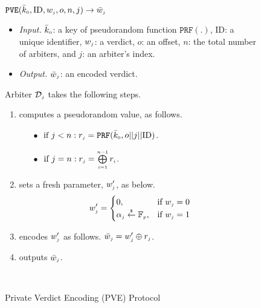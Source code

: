 \begin{figure}[!ht]
\setlength{\fboxsep}{0.7pt}
\begin{center}
\begin{boxedminipage}{12.3cm}
\small{
\underline{$\mathtt{PVE}(\bar{k}_{\scriptscriptstyle 0}, \text{ID},  w_{\scriptscriptstyle j}, o, n,  j)\rightarrow  \bar{  w}_{\scriptscriptstyle j}$}\\
%
\begin{itemize}
\item \noindent\textit{Input.} $\bar{k}_{\scriptscriptstyle 0}$: a key of  pseudorandom function $\mathtt{PRF}(.)$, $\text{ID}$: a unique identifier, $ w_{\scriptscriptstyle j}$: a  verdict, $o$: an offset, $n$: the total number of  arbiters,  and  $j$: an arbiter's index.
%
\item \noindent\textit{Output.} $\bar{  w}_{\scriptscriptstyle j}$:  an  encoded verdict.  
%
\end{itemize}
Arbiter $\mathcal{D}_{\scriptscriptstyle j}$ takes the following steps.
\begin{enumerate}
%
\item\label{ZSPA:val-gen} computes a  pseudorandom  value,  as follows. 
%
\begin{itemize}
%
\item[$\bullet$]$ \text{ if } j< n: r_{\scriptscriptstyle j}=\mathtt{PRF}(\bar k_{\scriptscriptstyle 0}, o||j||\text{ID})$.\\
%
\item [$\bullet$] $ \text{ if } j=n: r_{\scriptscriptstyle j}= \bigoplus\limits^{\scriptscriptstyle n-1}_{\scriptscriptstyle i=1} r_{\scriptscriptstyle i}$.
%
\end{itemize}
%
\item  sets a fresh parameter, $w'_{\scriptscriptstyle j}$, as below. 
%
\begin{equation*}
   w'_{\scriptscriptstyle j}= 
\begin{cases}
   0,              & \text{if } w_{\scriptscriptstyle j}=0\\
   \alpha_{\scriptscriptstyle j}\stackrel{\scriptscriptstyle\$}\leftarrow \mathbb{F}_{\scriptscriptstyle p} ,& \text{if } w_{\scriptscriptstyle j}=1\\

\end{cases}
\end{equation*}
%
\item encodes  $w'_{\scriptscriptstyle j}$ as follows. %
%
$\bar w_{\scriptscriptstyle j}= w'_{\scriptscriptstyle j}\oplus r_{\scriptscriptstyle j}$.
%
\item outputs $\bar{ w}_{\scriptscriptstyle j}$.


\
 \end{enumerate}
 
}
\end{boxedminipage}
\end{center}
\caption{Private Verdict Encoding  (PVE) Protocol} 
\label{fig:PVE}
\end{figure}
